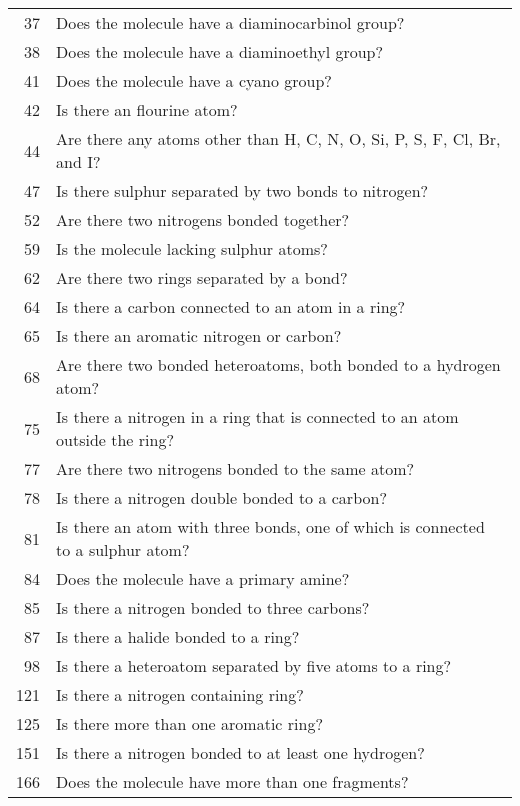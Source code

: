\begin{tabular}{rl}
37 &  Does the molecule have a diaminocarbinol group?   \\
38 &  Does the molecule have a diaminoethyl group?   \\
41 &  Does the molecule have a cyano group?   \\
42 &  Is there an flourine atom?  \\
44 &  Are there any atoms other than H, C, N, O, Si, P, S, F, Cl, Br, and I?  \\
47 &  Is there sulphur separated by two bonds to nitrogen?   \\
52 &  Are there two nitrogens bonded together?   \\
59 &  Is the molecule lacking sulphur atoms?   \\
62 &  Are there two rings separated by a bond?   \\
64 &  Is there a carbon connected to an atom in a ring?   \\
65 &  Is there an aromatic nitrogen or carbon?   \\
68 &  Are there two bonded heteroatoms, both bonded to a hydrogen atom?  \\
75 &  Is there a nitrogen in a ring that is connected to an atom outside the ring?   \\
77 &  Are there two nitrogens bonded to the same atom?   \\
78 &  Is there a nitrogen double bonded to a carbon?  \\
81 &  Is there an atom with three bonds, one of which is connected to a sulphur atom?   \\
84 &  Does the molecule have a primary amine?   \\
85 &  Is there a nitrogen bonded to three carbons?   \\
87 &  Is there a halide bonded to a ring?   \\
98 &  Is there a heteroatom separated by five atoms to a ring?   \\
121 &  Is there a nitrogen containing ring?   \\
125 &  Is there more than one aromatic ring?   \\
151 &  Is there a nitrogen bonded to at least one hydrogen?   \\
166 &  Does the molecule have more than one fragments?  \\
\bottomrule
\end{tabular}
